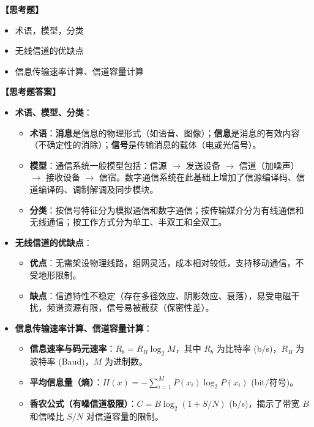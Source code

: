 \documentclass[a4paper,11pt]{ctexart}
\begin{document}
\noindent\textbf{【思考题】}
\begin{itemize}
    \item 术语，模型，分类
    \item 无线信道的优缺点
    \item 信息传输速率计算、信道容量计算
\end{itemize}

\noindent\textbf{【思考题答案】}
    \begin{itemize}
        \item \textbf{术语、模型、分类}：
        \begin{itemize}
            \item \textbf{术语}：\textbf{消息}是信息的物理形式（如语音、图像）；\textbf{信息}是消息的有效内容（不确定性的消除）；\textbf{信号}是传输消息的载体（电或光信号）。
            \item \textbf{模型}：通信系统一般模型包括：信源 $\to$ 发送设备 $\to$ 信道（加噪声） $\to$ 接收设备 $\to$ 信宿。数字通信系统在此基础上增加了信源编译码、信道编译码、调制解调及同步模块。
            \item \textbf{分类}：按信号特征分为模拟通信和数字通信；按传输媒介分为有线通信和无线通信；按工作方式分为单工、半双工和全双工。
        \end{itemize}
        
        \item \textbf{无线信道的优缺点}：
        \begin{itemize}
            \item \textbf{优点}：无需架设物理线路，组网灵活，成本相对较低，支持移动通信，不受地形限制。
            \item \textbf{缺点}：信道特性不稳定（存在多径效应、阴影效应、衰落），易受电磁干扰，频谱资源有限，信号易被截获（保密性差）。
        \end{itemize}
        
        \item \textbf{信息传输速率计算、信道容量计算}：
        \begin{itemize}
            \item \textbf{信息速率与码元速率}：$R_b = R_B \log_2 M$，其中 $R_b$ 为比特率 (b/s)，$R_B$ 为波特率 (Baud)，$M$ 为进制数。
            \item \textbf{平均信息量（熵）}：$H(x) = -\sum_{i=1}^{M} P(x_i) \log_2 P(x_i)$ (bit/符号)。
            \item \textbf{香农公式（有噪信道极限）}：$C = B \log_2(1 + S/N)$ (b/s)，揭示了带宽 $B$ 和信噪比 $S/N$ 对信道容量的限制。
        \end{itemize}
    \end{itemize}
\end{document}
